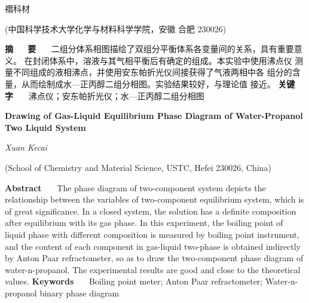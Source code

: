 \documentclass[12pt]{ctexart}
\numberwithin{equation}{section}
\begin{document}
\nocite{*}

\begin{center}
    \heiti {}

    \vspace{12pt}

    \kaishu \fontsize{13.75pt}{0}禤科材
    


    \vspace{5pt}

    \songti \fontsize{12pt}{0}(中国科学技术大学化学与材料科学学院，安徽 合肥 230026)
\end{center}


\noindent\textbf{摘~~~\!要}~~~\!
二组分体系相图描绘了双组分平衡体系各变量间的关系，具有重要意义。
在封闭体系中，溶液与其气相平衡后有确定的组成。本实验中使用沸点仪
测量不同组成的液相沸点，并使用安东帕折光仪间接获得了气液两相中各
组分的含量，从而绘制成水—正丙醇二组分相图。实验结果较好，与理论值
接近。
\newline
\textbf{关键字}~~~\!
沸点仪；安东帕折光仪；水—正丙醇二组分相图

\begin{center}
    {\LARGE\rmfamily\textbf{Drawing of Gas-Liquid Equilibrium Phase Diagram of Water-Propanol Two Liquid System}}

    \vspace{12pt}

    {\slshape Xuan Kecai}

    \vspace{5pt}

    (School of Chemistry and Material Science, USTC, Hefei 230026, China)
\end{center}

\noindent\textbf{Abstract}~~~\!
The phase diagram of two-component system depicts the
relationship between the variables of two-component
equilibrium system, which is of great significance. In a
closed system, the solution has a definite composition after
equilibrium with its gas phase. In this experiment, the
boiling point of liquid phase with different composition
is measured by boiling point instrument, and the content
of each component in gas-liquid two-phase is obtained
indirectly by Anton Paar refractometer, so as to draw the
two-component phase diagram of water-n-propanol. The
experimental results are good and close to the theoretical
values.
\newline
\textbf{Keywords}~~~\!
Boiling point meter; Anton Paar refractometer;
Water-n-propanol binary phase diagram
\end{document}
